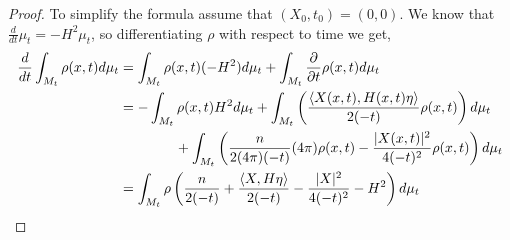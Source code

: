 \begin{proof}
To simplify the formula assume that $ \left(X_{0},t_{0}\right) = (0,0) $. We know that $ \frac{d}{dt} \mu_{t} = -H^{2} \mu_{t} $, so differentiating $ \rho $ with respect to time we get,
\begin{align}
    \frac{d}{dt} \int_{M_{t}}\rho(x,t)d \mu_{t}  &= \int_{M_{t}}\rho(x,t)(-H^{2})d \mu_{t} + \int_{M_{t}} \frac{\partial}{\partial t}\rho(x,t)d \mu_{t}\nonumber \\
    & = -\int_{M_{t}}\rho(x,t)H^{2}d \mu_{t} +\int_{M_{t}}\left( \frac{\left< X(x,t), H(x,t)\eta \right>}{2(-t)}\rho(x,t) \right)d\mu_{t}\nonumber \\
    &  \qquad \qquad  + \int_{M_{t}} \left( \frac{n}{2(4 \pi)(-t)}(4 \pi)\rho(x,t) -\frac{|X(x,t)|^{2}}{4(-t)^{2}}\rho(x,t)\right)d \mu_{t}\nonumber \\ 
    & = \int_{M_{t}}\rho\left(   \frac{n}{2(-t)} +\frac{\left< X,H \eta\right>}{2(-t)}- \frac{|X|^{2}}{4(-t)^{2}} -H^{2}\right)d \mu_{t}\label{rho0}
\end{align}


\end{proof}
